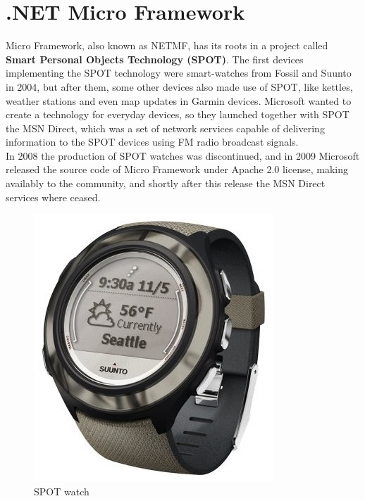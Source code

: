 \section{.NET Micro Framework}\label{S:SOTA-NETMF}
Micro Framework, also known as NETMF, has its roots in a project called \textbf{Smart Personal Objects Technology (SPOT)}. The first devices implementing the SPOT technology were smart-watches from Fossil and Suunto in 2004, but after them, some other devices also made use of SPOT, like kettles, weather stations and even map updates in Garmin devices. Microsoft wanted to create a technology for everyday devices, so they launched together with SPOT the MSN Direct, which was a set of network services capable of delivering information to the SPOT devices using FM radio broadcast signals.
\\
In 2008 the production of SPOT watches was discontinued, and in 2009 Microsoft released the source code of Micro Framework under Apache 2.0 license, making availably to the community, and shortly after this release the MSN Direct services where ceased.
\begin{figure}[H]\begin{center}
 \centering
  \captionsetup{justification=centering}
 \includegraphics[scale=1]{pictures/stateoftheart/spot}
  \caption{SPOT watch \label{fig:State-Art-SPOT-Watch}}
\end{center}\end{figure}

